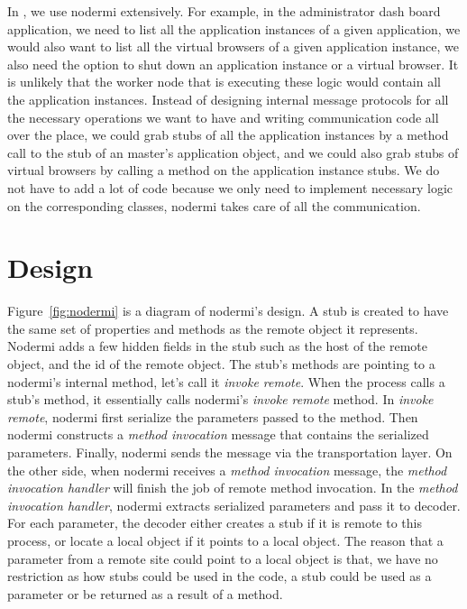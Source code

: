 In \projectname{}, we use nodermi extensively. 
For example, in the administrator dash board application, 
we need to list all the application instances of a given application,
we would also want to list all the virtual browsers of a given application instance,
we also need the option to shut down an application instance or a virtual browser.
It is unlikely that the worker node that is executing these logic would contain
all the application instances.
Instead of designing internal message protocols for all the necessary
operations we want to have and writing communication code all over 
the place, 
we could grab stubs of all the application instances by a method call
to the stub of an master's application object, 
and we could also grab stubs of virtual browsers by calling a method 
on the application instance stubs.
We do not have to add a lot of code because we only need to 
implement necessary logic on the corresponding classes,
nodermi takes care of all the communication.

\nodermifig{}

\section{Design}
Figure~\ref{fig:nodermi} is a diagram of nodermi's design.
A stub is created to have the same set of properties and methods as the remote object
it represents.
Nodermi adds a few hidden fields in the stub such as the host of the remote object,
and the id of the remote object.
The stub's methods are pointing to a nodermi's internal method,
let's call it \emph{invoke remote}.
When the process calls a stub's method, 
it essentially calls nodermi's \emph{invoke remote} method. 
In \emph{invoke remote}, nodermi first serialize the parameters passed
to the method.
Then nodermi constructs a \emph{method invocation} message that contains
the serialized parameters.
Finally, nodermi sends the message via the transportation layer.
On the other side, when nodermi receives a \emph{method invocation} message,
the \emph{method invocation handler} will finish the job of remote method invocation.
In the \emph{method invocation handler},
nodermi extracts serialized parameters and pass it to decoder.
For each parameter,
the decoder either creates a stub if it is remote to this process,
or locate a local object if it points to a local object.
The reason that a parameter from a remote site could point to a local object is that,
we have no restriction as how stubs could be used in the code, 
a stub could be used as a parameter or be returned as a result of a method.

